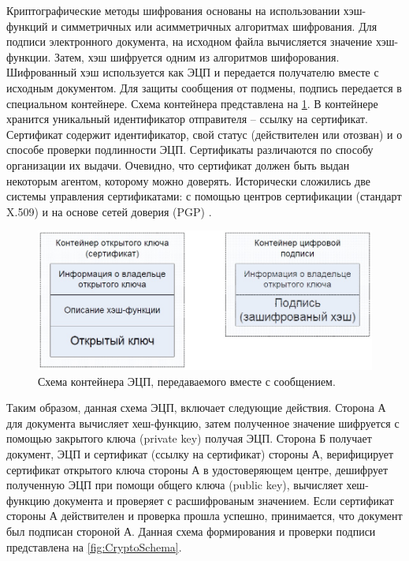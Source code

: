 \par Криптографические методы шифрования основаны на использовании хэш-функций и симметричных или асимметричных алгоритмах шифрования. Для подписи электронного документа, на исходном файла вычисляется значение хэш-функции. Затем, хэш шифруется одним из алгоритмов шифорования. Шифрованный хэш используется как ЭЦП и передается получателю вместе с исходным документом. Для защиты сообщения от подмены, подпись передается в специальном контейнере. Схема контейнера представлена на \ref{fig:CryptoPackage}. В контейнере хранится уникальный идентификатор отправителя – ссылку на сертификат. Сертификат содержит идентификатор, свой статус (действителен или отозван) и о способе проверки подлинности ЭЦП. Сертификаты различаются по способу организации их выдачи. Очевидно, что сертификат должен быть выдан некоторым агентом, которому можно доверять. Исторически сложились две системы управления сертификатами: с помощью центров сертификации (стандарт X.509) и на основе сетей доверия (PGP) \cite{polynskay2007}.
\begin{figure}[ht]
\centering
\includegraphics[width=0.7\linewidth]{CryptoPackage}
\caption{Схема контейнера ЭЦП, передаваемого вместе с сообщением.}
\label{fig:CryptoPackage}
\end{figure}
\par Таким образом, данная схема ЭЦП, включает следующие действия. Сторона А для документа вычисляет хеш-функцию, затем полученное значение шифруется с помощью закрытого ключа (private key) получая ЭЦП. Сторона Б получает документ, ЭЦП и сертификат (ссылку на сертификат) стороны А, верифицирует сертификат открытого ключа стороны А в удостоверяющем центре, дешифрует полученную ЭЦП при помощи общего ключа (public key), вычисляет хеш-функцию документа и проверяет с расшифрованым значением. Если сертификат стороны А действителен и проверка прошла успешно, принимается, что документ был подписан стороной А. Данная схема формирования и проверки подписи представлена на \ref{fig:CryptoSchema}.
